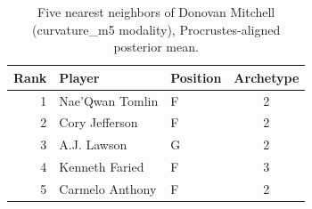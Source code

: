 \begin{table}[htbp]
  \centering\small
  \begin{tabular}{rllc}
    \toprule
    Rank & Player & Position & Archetype \\
    \midrule
    1 & Nae'Qwan Tomlin & F & 2 \\
    2 & Cory Jefferson & F & 2 \\
    3 & A.J. Lawson & G & 2 \\
    4 & Kenneth Faried & F & 3 \\
    5 & Carmelo Anthony & F & 2 \\
    \bottomrule
  \end{tabular}
  \caption{Five nearest neighbors of Donovan Mitchell (curvature_m5 modality), Procrustes-aligned posterior mean.}
  \label{tab:Donovan_Mitchell_neighbors_curvature_m5}
\end{table}

